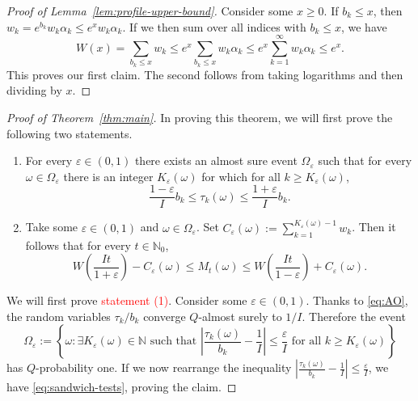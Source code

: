 \documentclass{article}
\newcommand{\NN}{\mathbb N}
\theoremstyle{definition}
\begin{document}
\begin{proof}[Proof of Lemma~\ref{lem:profile-upper-bound}]
Consider some $x\ge 0$. If $b_k\le x$, then $w_k=e^{b_k}w_k\alpha_k\le e^{x}w_k\alpha_k$. If we then sum over all indices with $b_k\le x$, we have
\[
W(x)=\sum_{b_k\le x}w_k\le e^x\sum_{b_k\le x}w_k\alpha_k\le e^{x}\sum_{k=1}^{\infty}w_k\alpha_k\le e^x.
\]
This proves our first claim. The second follows from taking logarithms and then dividing by $x$.
\end{proof}


\begin{proof}[Proof of Theorem~\ref{thm:main}]
In proving this theorem, we will first prove the following two statements.

\begin{enumerate}
    \item For every $\varepsilon\in(0,1)$ there exists an almost sure event $\Omega_\varepsilon$ such that for every $\omega\in\Omega_\varepsilon$ there is an integer $K_\varepsilon(\omega)$ for which for all $k\ge K_\varepsilon(\omega)$,
    \begin{equation}\label{eq:sandwich-tests}
    \frac{1-\varepsilon}{I}b_k\le \tau_k(\omega)\le \frac{1+\varepsilon}{I}b_k. 
    \end{equation}
    \item Take some $\varepsilon\in(0,1)$ and $\omega\in\Omega_\varepsilon$. Set $C_\varepsilon(\omega):=\sum_{k=1}^{K_\varepsilon(\omega)-1}w_k$. Then it follows that for every $t\in\mathbb N_0$,
    \begin{equation}\label{eq:M-sandwich}
    W\left(\frac{It}{1+\varepsilon}\right)-C_\varepsilon(\omega)\le M_t(\omega) \le W\left(\frac{It}{1-\varepsilon}\right)+C_\varepsilon(\omega).    
    \end{equation}
\end{enumerate}

We will first prove \textcolor{red}{statement (1)}. Consider some $\varepsilon\in(0,1)$. Thanks to \eqref{eq:AO}, the random variables $\tau_k/b_k$ converge $Q$-almost surely to $1/I$. Therefore the event
\[
\Omega_\varepsilon:=\left\{\omega : \exists K_\varepsilon(\omega)\in\NN \text{ such that } \left| \frac{\tau_k(\omega)}{b_k} - \frac{1}{I} \right| \le \frac{\varepsilon}{I} \text{ for all } k\ge K_\varepsilon(\omega) \right\}
\]
has $Q$-probability one. If we now rearrange the inequality $\left|\frac{\tau_k(\omega)}{b_k}-\frac{1}{I}\right|\le \frac{\varepsilon}{I}$, we have \eqref{eq:sandwich-tests}, proving the claim.


\end{proof}
\end{document}
